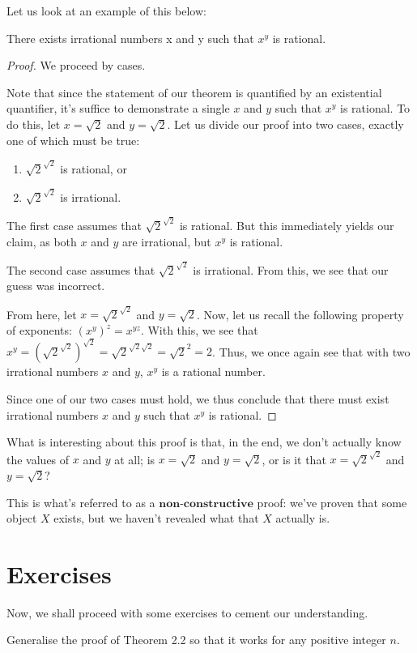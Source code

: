 \documentclass[openany]{book}
\begin{document}
Let us look at an example of this below:
\begin{thm}
	There exists irrational numbers x and y such that $x^y$ is rational.
\end{thm}
\begin{proof}
	We proceed by cases.
	
	Note that since the statement of our theorem is quantified by an existential quantifier, it's suffice to demonstrate a single $x$ and $y$ such that $x^y$ is rational. To do this, let $x=\sqrt{2}$ and $y=\sqrt{2}$. Let us divide our proof into two cases, exactly one of which must be true:
	
	\begin{enumerate}
		\item $\sqrt{2}^{\sqrt{2}}$ is rational, or
		\item $\sqrt{2}^{\sqrt{2}}$ is irrational.
	\end{enumerate}
	
	The first case assumes that $\sqrt{2}^{\sqrt{2}}$ is rational. But this immediately yields our claim, as both $x$ and $y$ are irrational, but $x^y$ is rational.
	
	The second case assumes that $\sqrt{2}^{\sqrt{2}}$ is irrational. From this, we see that our guess was incorrect. 
	
	From here, let $x=\sqrt{2}^{\sqrt{2}}$ and $y=\sqrt{2}$. Now, let us recall the following property of exponents: $(x^y)^z = x^{yz}$. With this, we see that $x^y = (\sqrt{2}^{\sqrt{2}})^{\sqrt{2}} = \sqrt{2}^{\sqrt{2}\sqrt{2}}=\sqrt{2}^2=2$. Thus, we once again see that with two irrational numbers $x$ and $y$, $x^y$ is a rational number.
	
	Since one of our two cases must hold, we thus conclude that there must exist irrational numbers $x$ and $y$ such that $x^y$ is rational.
\end{proof}

What is interesting about this proof is that, in the end, we don't actually know the values of $x$ and $y$ at all; is $x=\sqrt{2}$ and $y=\sqrt{2}$, or is it that $x=\sqrt{2}^{\sqrt{2}}$ and $y=\sqrt{2}$?

This is what's referred to as a $\textbf{non-constructive}$ proof: we've proven that some object $X$ exists, but we haven't revealed what that $X$ actually is.

\section{Exercises} Now, we shall proceed with some exercises to cement our understanding.
\begin{hw}
	Generalise the proof of Theorem 2.2 so that it works for any positive integer $n$.
\end{hw}
\end{document}
